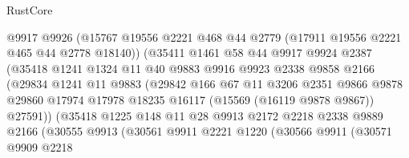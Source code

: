 \begin{lexlean}{RustCore}
\begin{coremodule}
                          @9917
                          @9926
                          (@15767
                            @19556
                            @2221
                            @468
                            @44
                            @2779
                            (@17911 @19556 @2221 @465 @44 @2778 @18140))
                          (@35411
                            @1461
                            @58
                            @44
                            @9917
                            @9924
                            @2387
                            (@35418
                              @1241
                              @1324
                              @11
                              @40
                              @9883
                              @9916
                              @9923
                              @2338
                              @9858
                              @2166
                              (@29834
                                @1241
                                @11
                                @9883
                                (@29842
                                  @166
                                  @67
                                  @11
                                  @3206
                                  @2351
                                  @9866
                                  @9878
                                  @29860
                                  @17974
                                  @17978
                                  @18235
                                  @16117
                                  (@15569 (@16119 @9878 @9867))
                                  @27591))
                              (@35418
                                @1225
                                @148
                                @11
                                @28
                                @9913
                                @2172
                                @2218
                                @2338
                                @9889
                                @2166
                                (@30555
                                  @9913
                                  (@30561
                                    @9911
                                    @2221
                                    @1220
                                    (@30566
                                      @9911
                                      (@30571
                                        @9909
                                        @2218

\end{coremodule}
\end{lexlean}
